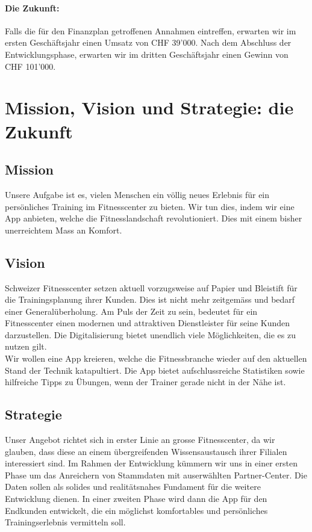 \paragraph{Die Zukunft:}
Falls die für den Finanzplan getroffenen Annahmen eintreffen, erwarten wir im ersten Geschäftsjahr einen Umsatz von CHF 39'000. Nach dem Abschluss der Entwicklungsphase, erwarten wir im dritten Geschäftsjahr einen Gewinn von CHF 101'000.





\clearpage
\section{Mission, Vision und Strategie: die Zukunft}
\subsection{Mission}
Unsere Aufgabe ist es, vielen Menschen ein völlig neues Erlebnis für ein persönliches Training im Fitnesscenter zu bieten. Wir tun dies, indem wir eine App anbieten, welche die Fitnesslandschaft revolutioniert. Dies mit einem bisher unerreichtem Mass an Komfort.

\subsection{Vision}
Schweizer Fitnesscenter setzen aktuell vorzugsweise auf Papier und Bleistift für die Trainingsplanung ihrer Kunden. Dies ist nicht mehr zeitgemäss und bedarf einer Generalüberholung. Am Puls der Zeit zu sein, bedeutet für ein Fitnesscenter einen modernen und attraktiven Dienstleister für seine Kunden darzustellen. Die Digitalisierung bietet unendlich viele Möglichkeiten, die es zu nutzen gilt. \\
Wir wollen eine App kreieren, welche die Fitnessbranche wieder auf den aktuellen Stand der Technik katapultiert. Die App bietet aufschlussreiche Statistiken sowie hilfreiche Tipps zu Übungen, wenn der Trainer gerade nicht in der Nähe ist.

\subsection{Strategie}
Unser Angebot richtet sich in erster Linie an grosse Fitnesscenter, da wir glauben, dass diese an einem übergreifenden Wissensaustausch ihrer Filialen interessiert sind. Im Rahmen der Entwicklung kümmern wir uns in einer ersten Phase um das Anreichern von Stammdaten mit auserwählten Partner-Center. Die Daten sollen als solides und realitätsnahes Fundament für die weitere Entwicklung dienen. In einer zweiten Phase wird dann die App für den Endkunden entwickelt, die ein möglichst komfortables und persönliches Trainingserlebnis vermitteln soll. 

